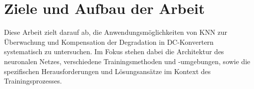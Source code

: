\section{Ziele und Aufbau der Arbeit}
Diese Arbeit zielt darauf ab, die Anwendungsmöglichkeiten von KNN zur Überwachung und Kompensation der Degradation in DC-Konvertern systematisch zu untersuchen. Im Fokus stehen dabei die Architektur des neuronalen Netzes, verschiedene Trainingsmethoden und -umgebungen, sowie die spezifischen Herausforderungen und Lösungsansätze im Kontext des Trainingsprozesses.
